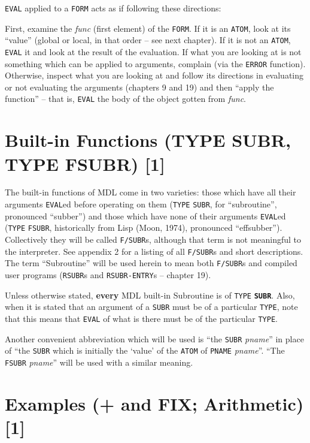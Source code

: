 \documentclass[a4paper]{scrbook}
\begin{document}
\texttt{EVAL} applied to a \texttt{FORM} acts as if following these directions:

First, examine the \emph{func} (first element) of the \texttt{FORM}. If it is an \texttt{ATOM}, look at its ``value''
(global or local, in that order -- see next chapter). If it is not an \texttt{ATOM}, \texttt{EVAL} it and look at the
result of the evaluation. If what you are looking at is not something which can be applied to arguments, complain (via the
\texttt{ERROR} function). Otherwise, inspect what you are looking at and follow its directions in evaluating or not
evaluating the arguments (chapters 9 and 19) and then ``apply the function'' -- that is, \texttt{EVAL} the body of the
object gotten from \emph{func}.

\section{Built-in Functions (TYPE SUBR, TYPE FSUBR) {[}1{]}}\label{built-in-functions-type-subr-type-fsubr-1}

The built-in functions of MDL come in two varieties: those which have all their arguments \texttt{EVAL}ed before operating
on them (\texttt{TYPE} \texttt{SUBR}, for ``subroutine'', pronounced ``subber'') and those
which have none of their arguments \texttt{EVAL}ed (\texttt{TYPE} \texttt{FSUBR}, historically
from Lisp (Moon, 1974), pronounced ``effsubber''). Collectively they will be called \texttt{F/SUBR}s, although that term is
not meaningful to the interpreter. See appendix 2 for a listing of all \texttt{F/SUBR}s and short descriptions. The term
``Subroutine'' will be used herein to mean both \texttt{F/SUBR}s and compiled user programs
(\texttt{RSUBR}s and \texttt{RSUBR-ENTRY}s -- chapter 19).

Unless otherwise stated, \textbf{every} MDL built-in Subroutine is of \texttt{TYPE} \textbf{\texttt{SUBR}}. Also, when it
is stated that an argument of a \texttt{SUBR} must be of a particular \texttt{TYPE}, note that this means that
\texttt{EVAL} of what is there must be of the particular \texttt{TYPE}.

Another convenient abbreviation which will be used is ``the \texttt{SUBR} \emph{pname}'' in place of ``the \texttt{SUBR}
which is initially the `value' of the \texttt{ATOM} of \texttt{PNAME} \emph{pname}''. ``The \texttt{FSUBR} \emph{pname}''
will be used with a similar meaning.

\section{Examples (+ and FIX; Arithmetic) {[}1{]}}\label{examples-and-fix-arithmetic-1}
\end{document}
